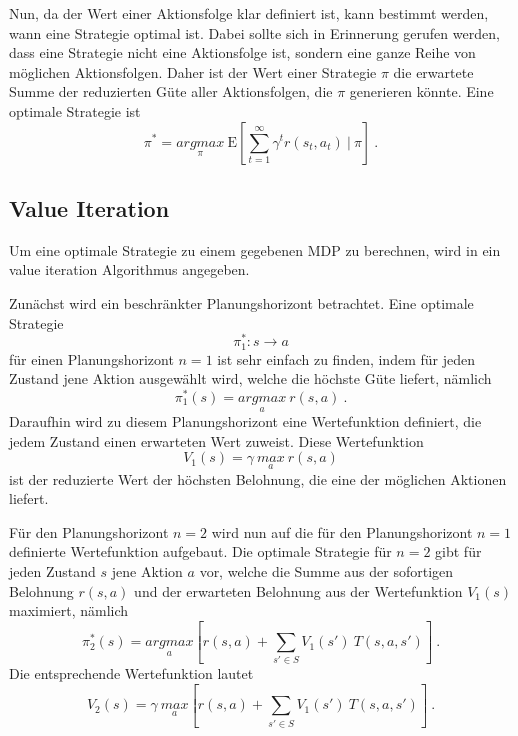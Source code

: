 \documentclass[a4paper]{IEEEtran}
\def\E{\mathrm{E}} %
\begin{document}
Nun, da der Wert einer Aktionsfolge klar definiert ist, kann bestimmt werden, wann eine Strategie optimal ist. Dabei sollte sich in Erinnerung gerufen werden, dass eine Strategie nicht eine Aktionsfolge ist, sondern eine ganze Reihe von möglichen Aktionsfolgen. Daher ist der Wert einer Strategie $\pi$ die erwartete Summe der reduzierten Güte aller Aktionsfolgen, die $\pi$ generieren könnte. Eine optimale Strategie ist
\begin{equation}
	\pi^* = \underset{\pi}{argmax}\ \E \left[ \sum\limits_{t=1}^{\infty} \gamma^t r(s_t, a_t) \ \vert\ \pi \right]\ .
\end{equation}

\subsection{Value Iteration}
\label{sec:valueIteration}
Um eine optimale Strategie zu einem gegebenen MDP zu berechnen, wird in \cite{thrun2005probabilistic} ein value iteration Algorithmus angegeben. 

Zunächst wird ein beschränkter Planungshorizont betrachtet. Eine optimale Strategie 
\begin{equation}
	\pi_1^*: s \rightarrow a
\end{equation}
für einen Planungshorizont $n=1$ ist sehr einfach zu finden, indem für jeden Zustand jene Aktion ausgewählt wird, welche die höchste Güte liefert, nämlich
\begin{equation}
	\pi_1^*(s)= \underset{a}{argmax}\ r(s, a)\ .
\end{equation}
Daraufhin wird zu diesem Planungshorizont eine Wertefunktion definiert, die jedem Zustand einen erwarteten Wert zuweist. Diese Wertefunktion
\begin{equation}
	V_1(s) = \gamma\ \underset{a}{max}\ r(s, a)
\end{equation}
ist der reduzierte Wert der höchsten Belohnung, die eine der möglichen Aktionen liefert.

Für den Planungshorizont $n=2$ wird nun auf die für den Planungshorizont $n=1$ definierte Wertefunktion aufgebaut. Die optimale Strategie für $n=2$ gibt für jeden Zustand $s$ jene Aktion $a$ vor, welche die Summe aus der sofortigen Belohnung $r(s,a)$ und der erwarteten Belohnung aus der Wertefunktion $V_1(s)$ maximiert, nämlich
\begin{equation}
	\pi_2^*(s) = \underset{a}{argmax} \left[ r(s,a) + \sum_{s' \in S} V_1(s')\ T(s, a, s') \right]\ .
\end{equation}
Die entsprechende Wertefunktion lautet
\begin{equation}
	V_2(s) = \gamma\ \underset{a}{max} \left[ r(s,a) + \sum_{s' \in S} V_1(s')\ T(s, a, s') \right]\ .
\end{equation}
\end{document}
